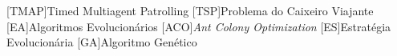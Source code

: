 \begin{acronym}[ACRONYM] 
[TMAP]{Timed Multiagent Patrolling}
[TSP]{Problema do Caixeiro Viajante}
[EA]{Algoritmos Evolucionários}
[ACO]{\textit{Ant Colony Optimization}}
[ES]{Estratégia Evolucionária}
[GA]{Algoritmo Genético}
\end{acronym}